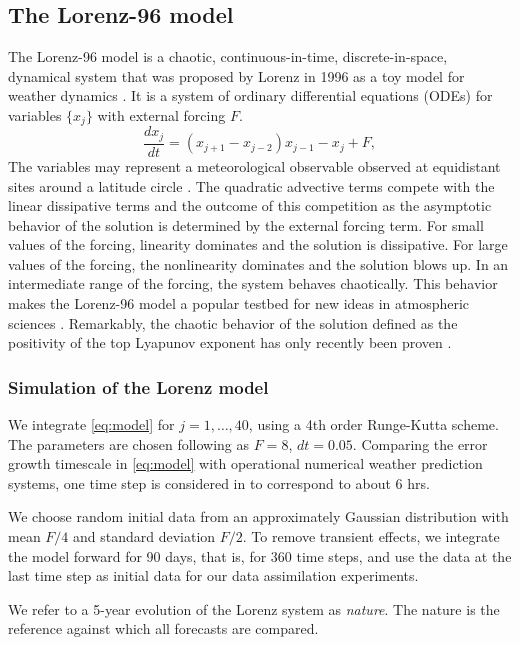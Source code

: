 \documentclass[10pt]{article}
\newcommand \be {\begin{equation}}
\newcommand \ee {\end{equation}}
\begin{document}
\subsection{The Lorenz-96 model}
The Lorenz-96 model is a chaotic, continuous-in-time, discrete-in-space, dynamical system that was proposed by Lorenz in 1996 as a toy model for weather dynamics \cite{Lorenz96}. It is a system of ordinary differential equations (ODEs) for variables $\{x_j\}$ with external forcing $F$. 
\be \label{eq:model} \frac{dx_j}{dt} = ( x_{j+1} - x_{j-2} ) x_{j-1} - x_j + F, \ee
The variables may represent a meteorological observable observed at equidistant sites around a latitude circle \cite{LorenzEmanuel98}. The quadratic advective terms compete with the linear dissipative terms and the outcome of this competition as the asymptotic behavior of the solution is determined by the external forcing term. For small values of the forcing, linearity dominates and the solution is dissipative. For large values of the forcing, the nonlinearity dominates and the solution blows up. In an intermediate range of the forcing, the system behaves chaotically. This behavior makes the Lorenz-96 model a popular testbed for new ideas in atmospheric sciences \cite{LorenzEmanuel98,Boffetta02,Ott04,Pazo08, Karimi10, Majda17}. Remarkably, the chaotic behavior of the solution defined as the positivity of the top Lyapunov exponent has only recently been proven \cite{Bedrossian20}. 

\subsubsection{Simulation of the Lorenz model}

We integrate \eqref{eq:model} for $j=1,\dots,40$, using a 4th order Runge-Kutta scheme. The parameters are chosen following \cite{LorenzEmanuel98} as $F=8$, $dt = 0.05$. Comparing the error growth timescale in \eqref{eq:model} with operational numerical weather prediction systems, one time step is considered in \cite{LorenzEmanuel98} to correspond to about 6 hrs. 

We choose random initial data from an approximately Gaussian distribution with mean $F/4$ and standard deviation $F/2$. To remove transient effects, we integrate the model forward for 90 days, that is, for $360$ time steps, and use the data at the last time step as initial data for our data assimilation experiments.

We refer to a 5-year evolution of the Lorenz system as {\it nature}. The nature is the reference against which all forecasts are compared. 
\end{document}
